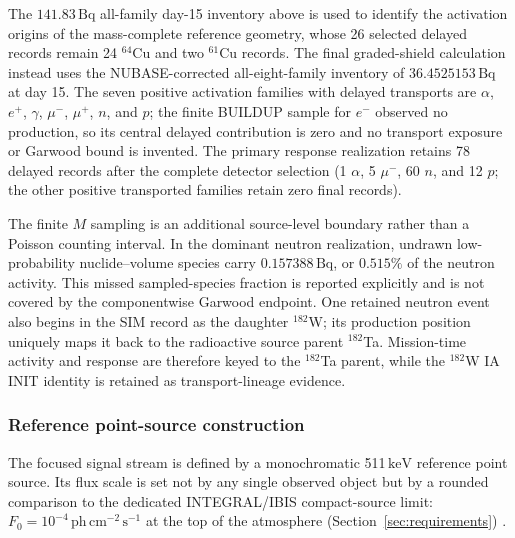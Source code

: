 \documentclass[11pt]{article}
\newcommand{\keV}{\ensuremath{\,\mathrm{keV}}}
\newcommand{\phcms}{\ensuremath{\,\mathrm{ph\,cm^{-2}\,s^{-1}}}}
\newcommand{\fzero}{F_{0}}
\begin{document}
The $141.83\,\mathrm{Bq}$ all-family day-15 inventory above is used to identify
the activation origins of the mass-complete reference geometry, whose 26 selected
delayed records remain 24 $^{64}$Cu and two $^{61}$Cu records. The final
graded-shield calculation instead uses the NUBASE-corrected all-eight-family
inventory of $36.4525153\,\mathrm{Bq}$ at day 15. The seven positive activation
families with delayed transports are $\alpha$, $e^+$, $\gamma$, $\mu^-$, $\mu^+$,
$n$, and $p$; the finite BUILDUP sample for $e^-$ observed no production, so its
central delayed contribution is zero and no transport exposure or Garwood bound
is invented. The primary response realization retains 78 delayed records after
the complete detector selection (1 $\alpha$, 5 $\mu^-$, 60 $n$, and 12 $p$;
the other positive transported families retain zero final records).

The finite $M$ sampling is an additional source-level boundary rather than a
Poisson counting interval. In the dominant neutron realization, undrawn
low-probability nuclide--volume species carry $0.157388\,\mathrm{Bq}$, or
$0.515\%$ of the neutron activity. This missed sampled-species fraction is
reported explicitly and is not covered by the componentwise Garwood endpoint.
One retained neutron event also begins in the SIM record as the daughter
$^{182}$W; its production position uniquely maps it back to the radioactive
source parent $^{182}$Ta. Mission-time activity and response are therefore keyed
to the $^{182}$Ta parent, while the $^{182}$W IA INIT identity is retained as
transport-lineage evidence.

\subsubsection{Reference point-source construction}
\label{subsec:pointsource}

The focused signal stream is defined by a monochromatic 511\keV{} reference
point source. Its flux scale is set not by any single observed object but by a
rounded comparison to the dedicated INTEGRAL/IBIS compact-source limit:
$\fzero=10^{-4}\phcms$ at the top of the atmosphere
(Section~\ref{sec:requirements}) \cite{DeCesare2011}.
\end{document}

